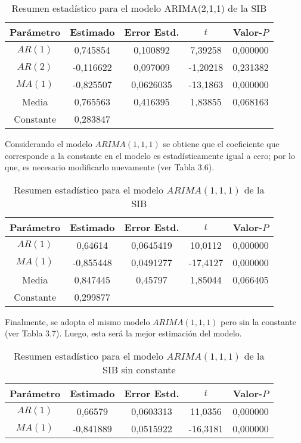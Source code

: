 \begin{ejemplo}
\begin{table}[H]
\centering
\begin{tabular}{@{}ccccc@{}}\hline
Par\'{a}metro & Estimado & Error Estd. & $t$ & Valor-$P$ \\ \hline
$AR(1)$ & 0,745854& 0,100892& 7,39258& 0,000000 \\
$AR(2)$ & -0,116622& 0,097009& -1,20218& 0,231382 \\
$MA(1)$ & -0,825507& 0,0626035& -13,1863& 0,000000 \\
Media   & 0,765563& 0,416395& 1,83855& 0,068163 \\
Constante & 0,283847& & &  \\ \hline
\end{tabular}
\caption{Resumen estad\'{i}stico para el modelo ARIMA(2,1,1) de la SIB}
\end{table}

Considerando el modelo $ARIMA(1,1,1)$ se obtiene que el coeficiente que corresponde a la constante en el modelo es estad\'{i}sticamente igual a cero; por lo que, es necesario modificarlo nuevamente (ver Tabla 3.6). 

\begin{table}[H]
\centering
\begin{tabular}{@{}ccccc@{}}\hline
Par\'{a}metro & Estimado & Error Estd. & $t$ & Valor-$P$ \\ \hline
$AR(1)$ & 0,64614& 0,0645419& 10,0112& 0,000000 \\
$MA(1)$ & -0,855448& 0,0491277& -17,4127& 0,000000 \\
Media   & 0,847445& 0,45797& 1,85044& 0,066405 \\
Constante & 0,299877& & &  \\ \hline
\end{tabular}
\caption{Resumen estad\'{i}stico para el modelo $ARIMA(1,1,1)$ de la SIB}
\end{table}

Finalmente, se adopta el mismo modelo $ARIMA(1,1,1)$ pero sin la constante (ver Tabla 3.7). Luego, esta ser\'{a} la mejor estimaci\'{o}n del modelo.

\begin{table}[H]
\centering
\begin{tabular}{@{}ccccc@{}}\hline
Par\'{a}metro& Estimado& Error Estd.& $t$&Valor-$P$ \\ \hline
$AR(1)$& 0,66579& 0,0603313& 11,0356& 0,000000 \\
$MA(1)$& -0,841889& 0,0515922& -16,3181& 0,000000 \\ \hline
\end{tabular}
\caption{Resumen estad\'{i}stico para el modelo $ARIMA(1,1,1)$ de la SIB sin constante}
\end{table}

\end{ejemplo}


